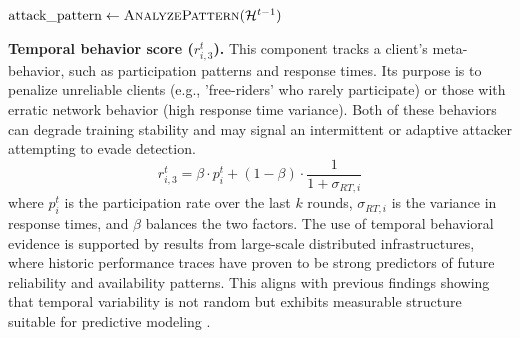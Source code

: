 \documentclass[lettersize,journal]{IEEEtran}
\begin{document}
{\begin{algorithm}[h]
$\text{attack\_pattern} \leftarrow \textsc{AnalyzePattern}(\mathcal{H}^{t-1})$\;



\end{algorithm}


\textbf{Temporal behavior score ($r_{i,3}^t$).}
This component tracks a client's meta-behavior, such as participation patterns and response times. Its purpose is to penalize unreliable clients (e.g., 'free-riders' who rarely participate) or those with erratic network behavior (high response time variance). Both of these behaviors can degrade training stability and may signal an intermittent or adaptive attacker attempting to evade detection.
\begin{equation}
r_{i,3}^t = \beta \cdot p_i^t + (1-\beta) \cdot \frac{1}{1 + \sigma_{RT,i}}
\end{equation}
where $p_i^t$ is the participation rate over the last $k$ rounds, $\sigma_{RT,i}$ is the variance in response times, and $\beta$ balances the two factors.
The use of temporal behavioral evidence is supported by results from large-scale distributed infrastructures, where historic performance traces have proven to be strong predictors of future reliability and availability patterns. This aligns with previous findings showing that temporal variability is not random but exhibits measurable structure suitable for predictive modeling \cite{4534237}.

}
\end{document}
